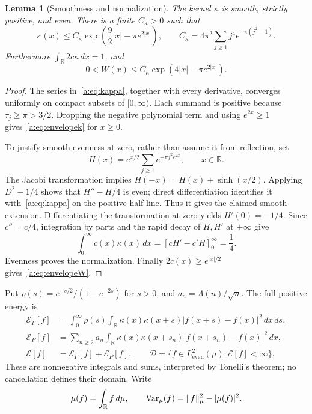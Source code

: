 \documentclass[11pt,a4paper]{article}
\numberwithin{equation}{section}
\newtheorem{lemma}[theorem]{Lemma}
\theoremstyle{definition}\newtheorem{definition}[theorem]{Definition}
\theoremstyle{remark}\newtheorem{remark}[theorem]{Remark}
\newcommand{\R}{\mathbb R}\newcommand{\C}{\mathbb C}\newcommand{\N}{\mathbb N}
\newcommand{\E}{\mathcal E}\newcommand{\D}{\mathcal D}
\newcommand{\He}{L^2_{\mathrm{even}}(\mu)}\newcommand{\Le}{L^2_{\mathrm{even}}(dx)}
\begin{document}
\begin{lemma}[Smoothness and normalization]\label{a:lem:theta}
The kernel $\kappa$ is smooth, strictly positive, and even. There is a finite $C_\kappa>0$ such that
\begin{equation}\label{a:eq:envelopek}
 \kappa(x)\le C_\kappa\exp\!\left(\frac92|x|-\pi e^{2|x|}\right),
 \qquad
 C_\kappa=4\pi^2\sum_{j\ge1}j^4e^{-\pi(j^2-1)}.
\end{equation}
Furthermore $\int_\R2c\kappa\,dx=1$, and
\begin{equation}\label{a:eq:envelopeW}
 0<W(x)\le C_\kappa\exp(4|x|-\pi e^{2|x|}).
\end{equation}
\end{lemma}
\begin{proof}
The series in~\eqref{a:eq:kappa}, together with every derivative, converges uniformly on compact subsets of $[0,\infty)$. Each summand is positive because $\tau_j\ge\pi>3/2$. Dropping the negative polynomial term and using $e^{2x}\ge1$ gives~\eqref{a:eq:envelopek} for $x\ge0$.

To justify smooth evenness at zero, rather than assume it from reflection, set
\[
 H(x)=e^{x/2}\sum_{j\ge1}e^{-\pi j^2e^{2x}},\qquad x\in\R.
\]
The Jacobi transformation \cite[Eq.~20.7.32]{DLMF} implies
$H(-x)=H(x)+\sinh(x/2)$. Applying $D^2-1/4$ shows that $H''-H/4$ is even; direct differentiation identifies it with~\eqref{a:eq:kappa} on the positive half-line. Thus it gives the claimed smooth extension. Differentiating the transformation at zero yields $H'(0)=-1/4$. Since $c''=c/4$, integration by parts and the rapid decay of $H,H'$ at $+\infty$ give
\[
 \int_0^\infty c(x)\kappa(x)\,dx
  =[cH'-c'H]_0^\infty=\frac14.
\]
Evenness proves the normalization. Finally $2c(x)\ge e^{|x|/2}$ gives~\eqref{a:eq:envelopeW}.
\end{proof}

Put $\rho(s)=e^{-s/2}/(1-e^{-2s})$ for $s>0$, and $a_n=\Lambda(n)/\sqrt n$. The full positive energy is
\begin{align}
 \E_\Gamma[f]&=\int_0^\infty\rho(s)\int_\R
       \kappa(x)\kappa(x+s)|f(x+s)-f(x)|^2\,dx\,ds,\label{a:eq:Eg}\\
 \E_P[f]&=\sum_{n\ge2}a_n\int_\R
       \kappa(x)\kappa(x+s_n)|f(x+s_n)-f(x)|^2\,dx,\label{a:eq:Ep}\\
 \E[f]&=\E_\Gamma[f]+\E_P[f],\qquad
 \D=\{f\in\He:\E[f]<\infty\}.\label{a:eq:Edomain}
\end{align}
These are nonnegative integrals and sums, interpreted by Tonelli's theorem; no cancellation defines their domain. Write
\[
 \mu(f)=\int_\R f\,d\mu,\qquad
 \Var_\mu(f)=\norm{f}_\mu^2-|\mu(f)|^2.
\]
\end{document}
